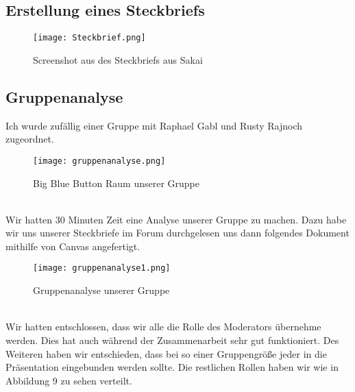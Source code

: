 \documentclass[12pt]{article}
\begin{document}
\subsection{Erstellung eines Steckbriefs}
\begin{figure}[h]
 \begin{center}
  \texttt{[image: Steckbrief.png]}
 \end{center}
 \caption{Screenshot aus des Steckbriefs aus Sakai}
\end{figure}
\subsection{Gruppenanalyse}
Ich wurde zufällig einer Gruppe mit Raphael Gabl und Rusty Rajnoch zugeordnet.
\begin{figure}[h]
 \begin{center}
  \texttt{[image: gruppenanalyse.png]}
 \end{center}
 \caption{Big Blue Button Raum unserer Gruppe}
\end{figure}\\
Wir hatten 30 Minuten Zeit eine Analyse unserer Gruppe zu machen. Dazu habe wir uns unserer Steckbriefe im Forum durchgelesen uns dann folgendes Dokument mithilfe von Canvas angefertigt.
\pagebreak
\begin{figure}[h]
 \begin{center}
  \texttt{[image: gruppenanalyse1.png]}
 \end{center}
 \caption{Gruppenanalyse unserer Gruppe}
\end{figure}\\
Wir hatten entschlossen, dass wir alle die Rolle des Moderators übernehme werden. Dies hat auch während der Zusammenarbeit sehr gut funktioniert. Des Weiteren haben wir entschieden, dass bei so einer Gruppengröße jeder in die Präsentation eingebunden werden sollte. Die restlichen Rollen haben wir wie in Abbildung 9 zu sehen verteilt.
\end{document}
